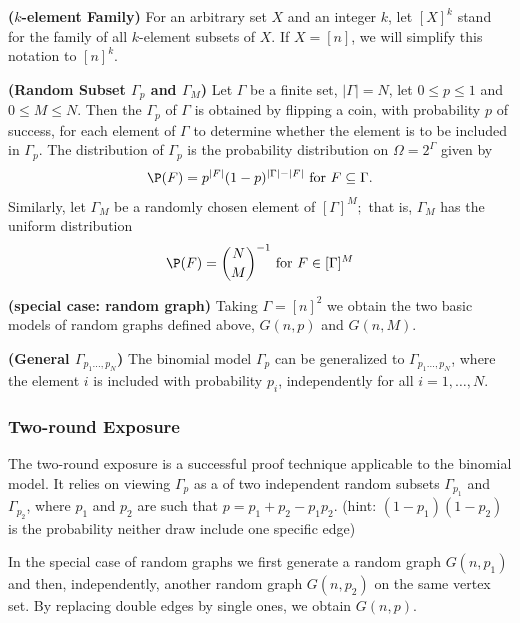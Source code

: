 \documentclass{article}
\newcommand{\bfs}[1]{\textbf{({#1}) }}
\begin{document}
\begin{defa}{\bfs{$k$-element Family}}
For an arbitrary set $X$ and an integer $k$, let $[X]^{k}$ stand for the family of all $k$-element subsets of $X$. If $X=[n]$, we will simplify this notation to $[n]^{k} .$
\end{defa}
\begin{defa}{\bfs{Random Subset $\Gamma_{p}$ and $\Gamma_{M}$}}
Let $\Gamma$ be a finite set, $|\Gamma|=N$, let $0 \leq p \leq 1$ and $0 \leq M \leq N .$ Then the  $\Gamma_{p}$ of $\Gamma$ is obtained by flipping a coin, with probability $p$ of success, for each element of $\Gamma$ to determine whether the element is to be included in $\Gamma_{p}$. The distribution of $\Gamma_{p}$ is the probability distribution on $\Omega=2^{\Gamma}$ given by 
\begin{align}
   \P (F)=p^{|F|}(1-p)^{|\Gamma|-|F|}\text{ for } F \subseteq \Gamma. \label{eq:gam_pdistr}
\end{align}
 Similarly, let  $\Gamma_{M}$ be a randomly chosen element of $[\Gamma]^{M} ;$ that is, $\Gamma_{M}$ has the uniform distribution $$\P (F)=\binom{N}{M}^{-1} \text{ for } F \in[\Gamma]^{M}$$
\end{defa}
\begin{rema}{\bfs{special case: random graph}}
Taking $\Gamma=[n]^{2}$ we obtain the two basic models of random graphs defined above, $G (n, p)$ and $G (n, M)$.
\end{rema}
\begin{defa}{\bfs{General $\Gamma_{p_{1} \ldots, p_{N}}$}}
 The binomial model $\Gamma_{p}$ can be generalized to $\Gamma_{p_{1} \ldots, p_{N}}$, where the element
$i$ is included with probability $p_{i}$, independently for all $i=1, \ldots, N$.
\end{defa}

\subsubsection{Two-round Exposure}

The two-round exposure is a successful proof technique applicable to the binomial model. It relies on viewing $\Gamma_{p}$ as a  of two independent random subsets $\Gamma_{p_{1}}$ and $\Gamma_{p_{2}}$, where $p_{1}$ and $p_{2}$ are such that $p=p_{1}+p_{2}-p_{1} p_{2}$. (hint: $(1-p_1)(1-p_2)$ is the probability neither draw include one specific edge)

In the special case of random graphs we first generate a random graph $G \left(n, p_{1}\right)$ and then, independently, another random graph $G \left(n, p_{2}\right)$ on the same vertex set. By replacing double edges by single ones, we obtain $G (n, p)$.
\end{document}

